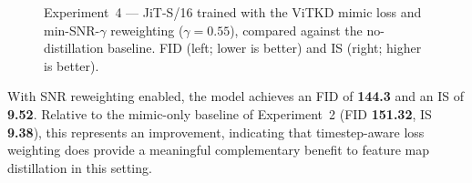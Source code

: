 \begin{figure}[ht]
    \centering
    \begin{subfigure}[b]{0.44\linewidth}
        \centering
    \end{subfigure}
    \hfill
    \begin{subfigure}[b]{0.44\linewidth}
        \centering
    \end{subfigure}
    \caption{Experiment~4 — JiT-S/16 trained with the ViTKD mimic loss
    and min-SNR-$\gamma$ reweighting ($\gamma = 0.55$), compared against
    the no-distillation baseline. FID (left; lower is better) and IS
    (right; higher is better).}
    \label{fig:exp4_results}
\end{figure}

With SNR reweighting enabled, the model achieves an FID of \textbf{144.3}
and an IS of \textbf{9.52}. Relative to the mimic-only baseline of
Experiment~2 (FID \textbf{151.32}, IS \textbf{9.38}), this represents an
improvement, indicating that timestep-aware loss weighting
does provide a meaningful complementary benefit to feature
map distillation in this setting.

